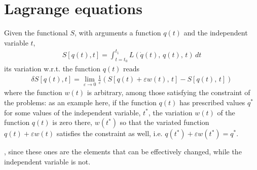 \documentclass[letterpaper,10pt,english]{jupyterBook}
\begin{document}
\section{Lagrange equations}
\label{\detokenize{ch/calculus-variations/intro:lagrange-equations}}\label{\detokenize{ch/calculus-variations/intro:calculus-variations-lagrange}}
\sphinxAtStartPar
Given the functional \(S\), with arguments a function \(q(t)\) and the independent variable \(t\),
\begin{equation*}
\begin{split}S[q(t),t] = \int_{t=t_0}^{t_1} L(\dot{q}(t), \, q(t), \, t) \, dt\end{split}
\end{equation*}
\sphinxAtStartPar
its variation w.r.t. the function \(q(t)\) reads
\begin{equation*}
\begin{split}\delta S[q(t), t] = \lim_{\varepsilon \rightarrow 0} \frac{1}{\varepsilon} \left( S[q(t)+\varepsilon w(t), \, t] - S[q(t),\, t]\right)\end{split}
\end{equation*}
\sphinxAtStartPar
where the function \(w(t)\) is arbitrary, among those satisfying the constraint of the problems: as an example here, if the function \(q(t)\) has prescribed values \(q^*\) for some values of the independent variable, \(t^*\), the variation \(w(t)\) of the function \(q(t)\) is zero there, \(w(t^*)\) so that the variated function \(q(t) + \varepsilon w(t)\) satisfies the constraint as well, i.e. \(q(t^*) + \varepsilon w(t^*) = q^*\).

\sphinxAtStartPar
{}, since these ones are the elements that can be effectively changed, while the independent variable is not.
\end{document}
